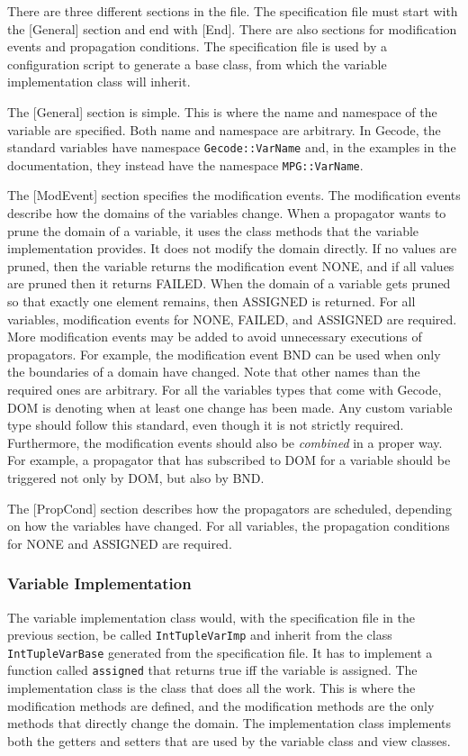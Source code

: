 \documentclass[a4paper,11pt]{article}
\begin{document}
There are three different sections in the file. The specification file must start with the [General] section and end with [End]. There are also sections for modification events and propagation conditions. The specification file is used by a configuration script to generate a base class, from which the variable implementation class will inherit.

The [General] section is simple. This is where the name and namespace of the variable are specified. Both name and namespace are arbitrary. In Gecode, the standard variables have namespace \texttt{Gecode::VarName} and, in the examples in the documentation, they instead have the namespace \texttt{MPG::VarName}.

The [ModEvent] section specifies the modification events. The modification events describe how the domains of the variables change. When a propagator wants to prune the domain of a variable, it uses the class methods that the variable implementation provides. It does not modify the domain directly. If no values are pruned, then the variable returns the modification event NONE, and if all values are pruned then it returns FAILED. When the domain of a variable gets pruned so that exactly one element remains, then ASSIGNED is returned. For all variables, modification events for NONE, FAILED, and ASSIGNED are required. More modification events may be added to avoid unnecessary executions of propagators. For example, the modification event BND can be used when only the boundaries of a domain have changed. Note that other names than the required ones are arbitrary. For all the variables types that come with Gecode, DOM is denoting when at least one change has been made. Any custom variable type should follow this standard, even though it is not strictly required. Furthermore, the modification events should also be \textit{combined} in a proper way. For example, a propagator that has subscribed to DOM for a variable should be triggered not only by DOM, but also by BND.

The [PropCond] section describes how the propagators are scheduled, depending on how the variables have changed. For all variables, the propagation conditions for NONE and ASSIGNED are required.

\subsubsection{Variable Implementation}
The variable implementation class would, with the specification file in the previous section, be called \texttt{IntTupleVarImp} and inherit from the class \texttt{IntTupleVarBase} generated from the specification file. It has to implement a function called \texttt{assigned} that returns true iff the variable is assigned. The implementation class is the class that does all the work. This is where the modification methods are defined, and the modification methods are the only methods that directly change the domain. The implementation class implements both the getters and setters that are used by the variable class and view classes.
\end{document}
